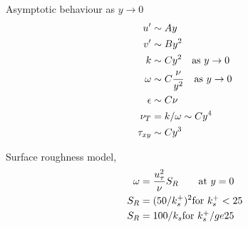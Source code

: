 \documentclass{article}
\begin{document}
Asymptotic behaviour as $y\rightarrow 0$
\begin{align*}
   u' &\sim A y \\
   v' &\sim B y^2 \\
   k &\sim C y^2 \quad\mbox{as $y\rightarrow 0$} \\
  \omega &\sim C {\nu\over y^2} \quad\mbox{as $y\rightarrow 0$} \\
   \epsilon &\sim C \nu \\
  \nu_T &= k/\omega \sim C y^4 \\
  \tau_{xy} &\sim C y^3
\end{align*}


Surface roughness model,
\begin{align*}
 \omega &= {u_\tau^2 \over \nu} S_R \qquad\mbox{at $y=0$} \\
 S_R &=  (50/k_s^+)^2 \mbox{for $k_s^+ < 25$} \\
 S_R &=  100/k_s \mbox{for $k_s^+ /ge 25$} 
\end{align*}



\vfill\eject


\end{document}
